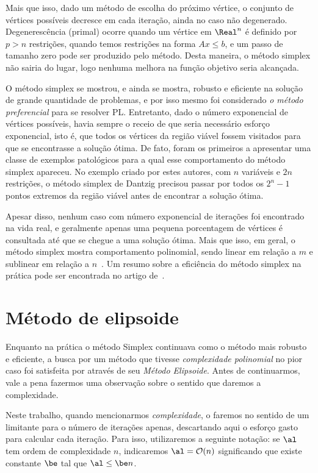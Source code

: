 Mais que isso, dado um método de escolha do próximo vértice, o conjunto de
vértices possíveis decresce em cada iteração,  ainda no caso não degenerado.
Degenerescência (primal) ocorre quando um vértice em $\Real^n$ é definido por
$p>n$ restrições, quando temos restrições na forma $Ax\leq b$, e um passo de tamanho zero pode ser produzido pelo método. Desta
maneira, o método simplex não sairia do lugar, logo nenhuma melhora na função
objetivo seria alcançada. 


O método simplex se mostrou, e ainda se mostra, robusto e eficiente na solução de grande
quantidade de problemas, e por isso mesmo foi considerado \emph{o método
preferencial} para se resolver \ac{PL}. Entretanto, dado o número exponencial
de  vértices possíveis, havia sempre o receio de que seria necessário esforço
exponencial, isto é, que   todos os vértices da região viável fossem
visitados para que se encontrasse a solução ótima. De fato, \textcite{Klee:1972wi}
foram os primeiros a apresentar uma classe de exemplos patológicos para a qual esse
comportamento  do método simplex apareceu. No exemplo criado por estes
autores, com $n$ variáveis e $2n$ restrições, o método simplex de Dantzig 
precisou passar por todos os $2^n-1$ pontos extremos da região viável antes de
encontrar a solução ótima. 


Apesar disso, nenhum caso com número exponencial de iterações foi encontrado na
vida real, e geralmente apenas uma pequena porcentagem de vértices é
consultada até que se chegue a uma solução ótima. Mais que isso, em geral, o método
simplex mostra comportamento polinomial, sendo linear em relação a $m$ e
sublinear em relação a $n$~\cite[pg.~94]{Fang:1993wu}. Um resumo sobre a
eficiência do método simplex na prática pode ser encontrada no artigo
de~\textcite{Shamir:1987th}.
 

\section{Método de elipsoide}

Enquanto na prática o método Simplex continuava como o método mais robusto e
eficiente, a busca por um método que tivesse \emph{complexidade polinomial} no pior
caso foi satisfeita por \textcite{Khachiyan:A-polynomial-algorithm:1979y} através
de seu  \emph{Método Elipsoide}. Antes de continuarmos, vale a pena fazermos uma observação sobre o sentido que daremos a complexidade.

\begin{obs}
Neste trabalho, quando mencionarmos \emph{complexidade}, o faremos no sentido de um limitante para o número de iterações apenas, descartando aqui o esforço gasto para calcular cada iteração.
Para isso, utilizaremos a seguinte notação: se $\al$ tem ordem de complexidade $n$, indicaremos $\al = \Oset(n)$ significando que  existe constante $\be$ tal que $\al \leq \be n$.
\end{obs}

